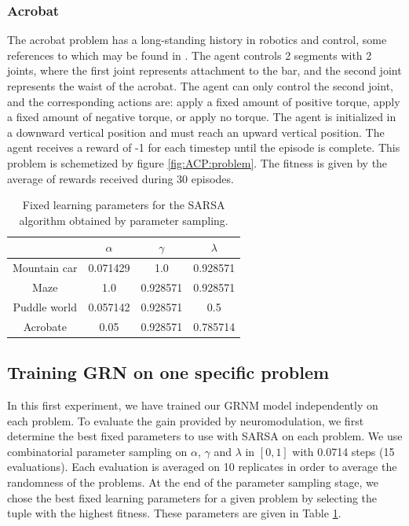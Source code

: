 \subsubsection{Acrobat}

The acrobat problem has a long-standing history in robotics and control, some references to which may be found in \cite{sutton1998introduction}. The agent controls 2 segments with 2 joints, where the first joint represents attachment to the bar, and the second joint represents the waist of the acrobat. The agent can only control the second joint, and the corresponding actions are: apply a fixed amount of positive torque, apply a fixed amount of negative torque, or apply no torque. The agent is initialized in a downward vertical position and must reach an upward vertical position. The agent receives a reward of -1 for each timestep until the episode is complete. This problem is schemetized by figure \ref{fig:ACP:problem}. The fitness is given by the average of rewards received during 30 episodes.

\begin{table}[b]
\center
\begin{tabular}{|c|ccc|}
\cline{2-4}
\multicolumn{1}{c|}{ }	& $\alpha$	& $\gamma$	& $\lambda$	\\\hline
Mountain car			& 0.071429	& 1.0		& 0.928571 	\\%
Maze				& 1.0		& 0.928571	& 0.928571	\\%
Puddle world			&  0.057142	& 0.928571	& 0.5		\\%
Acrobate				& 0.05		& 0.928571	& 0.785714	\\\hline
\end{tabular}
\caption{Fixed learning parameters for the SARSA algorithm obtained by parameter sampling.}\label{tab:SARSAFixedParams}
\end{table}


\subsection{Training GRN on one specific problem}
In this first experiment, we have trained our GRNM model independently on each problem. To evaluate the gain provided by neuromodulation, we first determine the best fixed parameters to use with SARSA on each problem. We use combinatorial parameter sampling on $\alpha$, $\gamma$ and $\lambda$ in $[0, 1]$ with 0.0714 steps (15 evaluations). Each evaluation is averaged on 10 replicates in order to average the randomness of the problems. At the end of the parameter sampling stage, we chose the best fixed learning parameters for a given problem by selecting the tuple with the highest fitness. These parameters are given in Table \ref{tab:SARSAFixedParams}.

